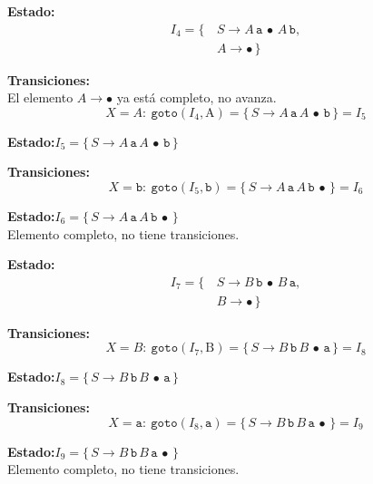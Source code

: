 \documentclass[12pt,letterpaper]{article}
\newcommand{\nt}[1]{\textit{#1}}
\newcommand{\tk}[1]{\texttt{#1}}
\newcommand{\tx}[1]{\text{#1}}
\begin{document}
\begin{enumerate}[label=\arabic*.]
  \medskip

  \textbf{Estado:}
  \[
  \begin{aligned}
    I_4 = \{\, & \nt{S}\to\nt{A}\,\tk{a}\,\bullet\,\nt{A}\,\tk{b},\\
               & \nt{A}\to\bullet\,\}
  \end{aligned}
  \]

  \textbf{Transiciones:}\\
  El elemento $\nt{A}\to\bullet$ ya está completo, no avanza.
  \[
  X=\nt{A}:\ \texttt{goto}(I_4,\tx{A}) = \{\,\nt{S}\to\nt{A}\,\tk{a}\,\nt{A}\,\bullet\,\tk{b}\,\} = \boxed{I_5}
  \]

  \medskip

  \textbf{Estado:}\quad $I_5 = \{\,\nt{S}\to\nt{A}\,\tk{a}\,\nt{A}\,\bullet\,\tk{b}\,\}$

  \textbf{Transiciones:}
  \[
  X=\tk{b}:\ \texttt{goto}(I_5,\tk{b}) = \{\,\nt{S}\to\nt{A}\,\tk{a}\,\nt{A}\,\tk{b}\,\bullet\,\} = \boxed{I_6}
  \]

  \medskip

  \textbf{Estado:}\quad $I_6 = \{\,\nt{S}\to\nt{A}\,\tk{a}\,\nt{A}\,\tk{b}\,\bullet\,\}$\\
  Elemento completo, no tiene transiciones.

  \medskip

  \textbf{Estado:}
  \[
  \begin{aligned}
    I_7 = \{\, & \nt{S}\to\nt{B}\,\tk{b}\,\bullet\,\nt{B}\,\tk{a},\\
               & \nt{B}\to\bullet\,\}
  \end{aligned}
  \]

  \textbf{Transiciones:}
  \[
  X=\nt{B}:\ \texttt{goto}(I_7,\tx{B}) = \{\,\nt{S}\to\nt{B}\,\tk{b}\,\nt{B}\,\bullet\,\tk{a}\,\} = \boxed{I_8}
  \]

  \medskip

  \textbf{Estado:}\quad $I_8 = \{\,\nt{S}\to\nt{B}\,\tk{b}\,\nt{B}\,\bullet\,\tk{a}\,\}$

  \textbf{Transiciones:}
  \[
  X=\tk{a}:\ \texttt{goto}(I_8,\tk{a}) = \{\,\nt{S}\to\nt{B}\,\tk{b}\,\nt{B}\,\tk{a}\,\bullet\,\} = \boxed{I_9}
  \]

  \medskip

  \textbf{Estado:}\quad $I_9 = \{\,\nt{S}\to\nt{B}\,\tk{b}\,\nt{B}\,\tk{a}\,\bullet\,\}$\\
  Elemento completo, no tiene transiciones.\\
  
  \bigskip
  

\end{enumerate}
\end{document}
